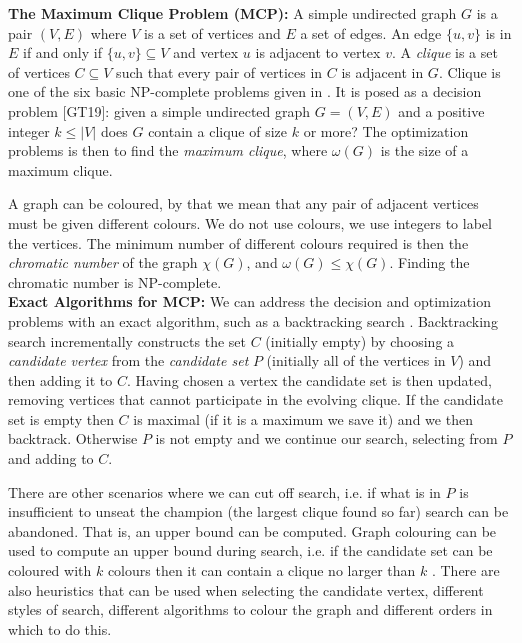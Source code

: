\documentclass{l4proj}
\begin{document}
\noindent
{\bf The Maximum Clique Problem (MCP):}
A simple undirected graph $G$ is a pair $(V,E)$ where $V$ is a set of vertices and $E$ a set of edges. An edge
$\{u,v\}$ is in $E$ if and only if $\{u,v\} \subseteq V$ and vertex $u$ is adjacent to vertex $v$. A \emph{clique} is a 
set of vertices $C \subseteq V$ such that every pair of vertices in $C$ is adjacent in $G$.
Clique is one of the six basic NP-complete problems given in \cite{gareyJohnson}. It is posed as a decision
problem [GT19]: given a simple undirected graph $G = (V,E)$ and a positive integer $k \leq |V|$ does $G$ contain a clique of size 
$k$ or more? The optimization problems is then to find the \emph{maximum clique}, where $\omega(G)$ is the size of a maximum clique. 

A graph can be coloured, by that we mean that any pair of adjacent vertices must be given different colours. We do not use colours, 
we use integers to label the vertices. The minimum number of different colours required is then the
\emph{chromatic number} of the graph $\chi(G)$, and $\omega(G) \leq \chi(G)$. Finding the chromatic number is NP-complete.\\ 

\noindent
{\bf Exact Algorithms for MCP:}
We can address the decision and optimization problems with an exact algorithm, 
such as a backtracking search 
\cite{fahle,regin2003,wood97,carraghanPardalos90,pardalosRodgers92,prjo2002,segundo2011,segundo2011b,Konc_Janezic_2007,tomita2003,tomita2010,aaai2010,carmoZuge}.
Backtracking search incrementally constructs the set $C$ (initially empty) by choosing a \emph{candidate vertex}
from  the \emph{candidate set} $P$ (initially all of the vertices in $V$) and then adding it to $C$. 
Having chosen a vertex the candidate set is then updated, removing vertices
that cannot participate in the evolving clique. If the candidate set is empty then $C$ is maximal (if it is a maximum we save it)
and we then backtrack. Otherwise $P$ is not empty and we continue our search, selecting from $P$ and adding to $C$.

There are other scenarios where we can cut off search, i.e. if what is in $P$ is insufficient
to unseat the champion (the largest clique found so far) search can be abandoned. That is, an upper bound can be computed.
Graph colouring can be used to compute an upper
bound during search, i.e. if the candidate set can be coloured with $k$ colours then it can contain a clique no larger than $k$
\cite{wood97,fahle,segundo2011,Konc_Janezic_2007,tomita2003,tomita2010}. There are also heuristics that can be used when selecting
the candidate vertex, different styles of search, different algorithms to colour the graph and different
orders in which to do this.\\
\end{document}
